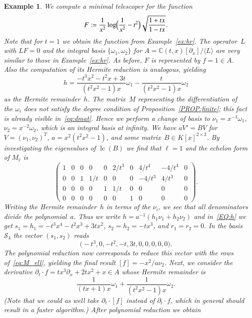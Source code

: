 \documentclass[final,1p,times,authoryear]{elsarticle}
\newtheorem{example}[theorem]{Example}
\def\<#1>{\langle#1\rangle}
\newcommand{\bC}{ {\mathbb C}}
\newcommand{\cS}{ {\mathcal S}}
\def\lc{\operatorname{lc}}
\begin{document}
\begin{example}
We compute a minimal telescoper for the function
\[
  F := \frac{1}{x^2} \log\Bigl(\frac{1}{x^2}-t^2\Bigr)\sqrt{\frac{1+tx}{1-tx}}.
\]
Note that for $t=1$ we
obtain the function from Example~\ref{ex:hr}. The operator~$L$ with $LF=0$
and the integral basis $\{\omega_1,\omega_2\}$ for
$A=\bC(t,x)[\partial_x]/\<L>$ are very similar to those in Example~\ref{ex:hr}.
As before, $F$ is represented by $f=1\in A$.
Also the computation of its Hermite reduction is analogous, yielding
\[
  h = \frac{-t^3x^2-t^2x+3t}{(t^2x^2-1)x} \omega_1 - \frac{t}{(t^2x^2-1)x} \omega_2
\]
as the Hermite remainder~$h$. The matrix~$M$ representing the differentiation
of the $\omega_i$ does not satisfy the degree condition of
Proposition~\ref{PROP:finite}; this fact is already visible
in~\eqref{eq:dmat}. Hence we perform a change of basis to
$\nu_1=x^{-1}\omega_1$, $\nu_2=x^{-2}\omega_2$, which is an integral basis at
infinity. We have $aV'=BV$ for $V=(\nu_1,\nu_2)^T$, $a=x^2(t^2x^2-1)$, and
some matrix~$B\in K[x]^{2\times2}$.  By investigating the eigenvalues of
$\lc(B)$ we find that $\ell=1$ and the echelon form of $M_\ell$ is
\begin{equation}\label{eq:M_ell}
  \begin{pmatrix}
  1 & 0 & 0 & 0 & 0 & 2/t^3 & 0 & 4/t^4 & -4/t^4 & 0 \\
  0 & 0 & 1 & 1/t & 0 & 0 & 0 & -4/t^3 & 4/t^3 & 0 \\
  0 & 0 & 0 & 0 & 1 & 1/t & 0 & 0 & 0 & 0 \\
  0 & 0 & 0 & 0 & 0 & 0 & 1 & 0 & 0 & 0
  \end{pmatrix}.
\end{equation}
Writing the Hermite remainder~$h$ in terms of the $\nu_i$, we see that all
denominators divide the polynomial~$a$. Thus we write
$h=a^{-1}(h_1\nu_1+h_2\nu_2)$ and in~\eqref{EQ:h} we get
$s_1=h_1=-t^3x^4-t^2x^3+3tx^2$, $s_2=h_2=-tx^3$, and $r_1=r_2=0$.
In the basis $\cS_4$ the vector $(s_1,s_2)$ reads
\[
  \bigl(-t^3, 0, -t^2, -t, 3 t, 0, 0, 0, 0, 0\bigr).
\]
The polynomial reduction now corresponds to reduce this vector with the rows
of~\eqref{eq:M_ell}, yielding the final result $[f]=-x^2/a\nu_2$.  Next, we
consider the derivative $\partial_t\cdot f=tx^3\partial_x+2tx^2+x\in A$ whose
Hermite remainder is
\[
  \frac{1}{(tx+1)x} \omega_1 + \frac{1}{(t^2x^2-1)x} \omega_2.
\]
(Note that we could as well take $\partial_t\cdot [f]$ instead of $\partial_t\cdot f$, which
in general should result in a faster algorithm.)
After polynomial reduction we obtain

\end{example}
\end{document}
